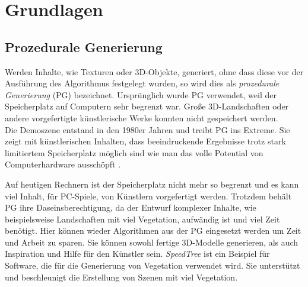 \chapter{Grundlagen}
\label{chapter:basics}


\section{Prozedurale Generierung}
\label{procedural_generation}

Werden Inhalte, wie Texturen oder 3D-Objekte, generiert, ohne dass diese vor der Ausführung des Algorithmus festgelegt wurden, so wird dies als \emph{prozedurale Generierung} (PG) bezeichnet.
Ursprünglich wurde PG verwendet, weil der Speicherplatz auf Computern sehr begrenzt war. Große 3D-Landschaften oder andere vorgefertigte künstlerische Werke konnten nicht gespeichert werden.\\
Die Demoszene entstand in den 1980er Jahren und treibt PG ins Extreme. Sie zeigt mit künstlerischen Inhalten, dass beeindruckende Ergebnisse trotz stark limitiertem Speicherplatz möglich sind \bzw wie man das volle Potential von Computerhardware ausschöpft  \cite{DemoScene}. 

Auf heutigen Rechnern ist der Speicherplatz nicht mehr so begrenzt und es kann viel Inhalt, \zb für PC-Spiele, von Künstlern vorgefertigt werden. Trotzdem behält PG ihre Daseinsberechtigung, da der Entwurf komplexer Inhalte, wie beispielsweise Landschaften mit viel Vegetation, aufwändig ist und viel Zeit benötigt. Hier können wieder Algorithmen aus der PG eingesetzt werden um Zeit und Arbeit zu sparen. Sie können sowohl fertige 3D-Modelle generieren, als auch Inspiration und Hilfe für den Künstler sein. \emph{SpeedTree} \cite{SpeedTree} ist ein Beispiel für Software, die für die Generierung von Vegetation verwendet wird. Sie unterstützt und beschleunigt die Erstellung von Szenen mit viel Vegetation. \cite{PCGSurvey_videoGames}

